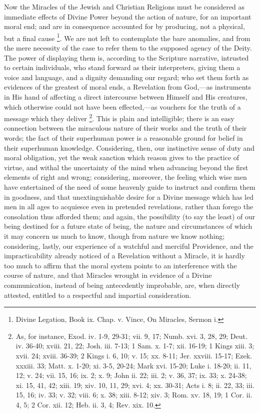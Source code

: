 Now the Miracles of the Jewish and Christian
Religions must be considered as immediate effects of Divine Power
beyond the action of nature, for an important moral end; and are in
consequence accounted for by producing, not a physical, but a final
cause \footnote{Divine Legation, Book ix. Chap. v. Vince, On
Miracles, Sermon i.}. We are not left to contemplate
the bare anomalies, and from the mere necessity of the case to refer
them to the supposed agency of the Deity. The power of displaying them
is, according to the Scripture narrative, intrusted to certain
individuals, who stand forward as their interpreters, giving them a
voice and language, and a dignity demanding our regard; who set them
forth as evidences of the greatest of moral ends, a Revelation from
God,—as instruments in His hand of affecting a direct intercourse
between Himself and His creatures, which otherwise could not have
been effected,—as vouchers for the truth of a message which they
deliver \footnote{As, for instance, Exod. iv. 1-9, 29-31; vii.
9, 17; Numb. xvi. 3, 28, 29; Deut. iv. 36-40; xviii. 21, 22; Josh.
iii. 7-13; 1 Sam. x. 1-7; xii. 16-19; 1 Kings xiii. 3; xvii. 24; xviii.
36-39; 2 Kings i. 6, 10; v. 15; xx. 8-11; Jer. xxviii. 15-17; Ezek.
xxxiii. 33; Matt. x. 1-20; xi. 3-5, 20-24; Mark xvi. 15-20; Luke i.
18-20; ii. 11, 12; v. 24; vii. 15, 16; ix. 2; x. 9; John ii. 22; iii.
2; v. 36, 37; ix. 33; x. 24-38; xi. 15, 41, 42; xiii. 19; xiv. 10, 11,
29; xvi. 4; xx. 30-31; Acts i. 8; ii. 22, 33; iii. 15, 16; iv. 33; v.
32; viii. 6; x. 38; xiii. 8-12; xiv. 3; Rom. xv. 18, 19; 1 Cor. ii.
4, 5; 2 Cor. xii. 12; Heb. ii. 3, 4; Rev. xix. 10.}. This is plain and
intelligible; there is an easy connection between the miraculous
nature of their works and the truth of their words; the fact of their
superhuman power is a reasonable ground for belief in their superhuman
knowledge. Considering, then, our instinctive sense of duty and moral
obligation, yet the weak sanction which reason gives to the practice
of virtue, and withal the uncertainty of the mind when advancing
beyond the first elements of right and wrong; considering, moreover,
the feeling which wise men have entertained of the need of some
heavenly guide to instruct and confirm them in goodness, and that
unextinguishable desire for a Divine message which has led men in all
ages to acquiesce even in pretended revelations, rather than forego
the consolation thus afforded them; and again, the possibility (to say
the least) of our being destined for a future state of being, the
nature and circumstances of which it may concern us much to know,
though from nature we know nothing; considering, lastly, our
experience of a watchful and merciful Providence, and the
impracticability already noticed of a Revelation without a Miracle, it
is hardly too much to affirm that the moral system points to an
interference with the course of nature, and that Miracles wrought in
evidence of a Divine communication, instead of being antecedently
improbable, are, when directly attested, entitled to a respectful and
impartial consideration.


